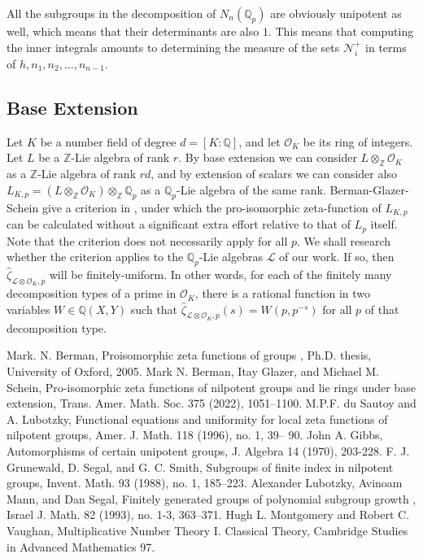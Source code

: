 \documentclass[12pt]{article}
\begin{document}
All the subgroups in the decomposition of $N_n(\mathbb{Q}_p)$ are obviously unipotent as well, which means that their determinants are also $1$. This means that computing the inner integrals amounts to determining the measure of the sets $\mathcal{N}^+_i$ in terms of ${h},{n}_1,{n}_2,\dots,{n}_{n-1}$.







\subsection{Base Extension}
Let $K$ be a number field of degree $d=[K:\mathbb{Q}]$, and let $\mathcal{O}_K$ be its ring of integers. Let $L$ be a $\mathbb{Z}$-Lie algebra of rank $r$. By base extension we can consider $L\otimes_{\mathbb{Z}}\mathcal{O}_K$ as a $\mathbb{Z}$-Lie algebra of rank $rd$, and by extension of scalars we can consider also $L_{K,p}=(L\otimes_{\mathbb{Z}}\mathcal{O}_K)\otimes_{\mathbb{Z}}\mathbb{Q}_p$ as a $\mathbb{Q}_p$-Lie algebra of the same rank. Berman-Glazer-Schein give a criterion in \cite{BermanGlazerSchein}, under which the pro-isomorphic zeta-function of $L_{K,p}$ can be calculated without a significant extra effort relative to that of $L_p$ itself. Note that the criterion does not necessarily apply for all $p$. We shall research whether the criterion applies to the $\mathbb{Q}_p$-Lie algebras $\mathcal{L}$ of our work. If so, then $\hat\zeta_{\mathcal{L}\otimes\mathcal{O}_K,p}$ will be finitely-uniform. In other words, for each of the finitely many decomposition types of a prime in $\mathcal{O}_K$, there is a rational function in two variables $W\in\mathbb{Q}(X,Y)$ such that $\hat\zeta_{\mathcal{L}\otimes\mathcal{O}_K,p}(s)=W(p,p^{-s})$ for all $p$ of that decomposition type.
\begin{thebibliography}{2}
 Mark. N. Berman,
Proisomorphic zeta functions of groups
, Ph.D. thesis, University of Oxford,
2005.
 Mark N. Berman, Itay Glazer, and Michael M. Schein, Pro-isomorphic zeta functions of nilpotent groups and lie rings under base extension, Trans. Amer. Math. Soc. 375 (2022), 1051–1100.
 M.P.F. du Sautoy and A. Lubotzky, Functional equations and uniformity for
local zeta functions of nilpotent groups, Amer. J. Math. 118 (1996), no. 1, 39–
90.
 John A. Gibbs, Automorphisms of certain unipotent groups, J. Algebra 14 (1970), 203-228.
 F. J. Grunewald, D. Segal, and G. C. Smith, Subgroups of finite index in nilpotent groups,
Invent. Math. 93 (1988), no. 1, 185–223.
 Alexander Lubotzky, Avinoam Mann, and Dan Segal,
Finitely generated groups of polynomial
subgroup growth
, Israel J. Math.
82
(1993), no. 1-3, 363–371.
 Hugh L. Montgomery and Robert C. Vaughan, Multiplicative Number Theory I. Classical Theory, Cambridge Studies in Advanced Mathematics 97.
\end{thebibliography}
\end{document}
